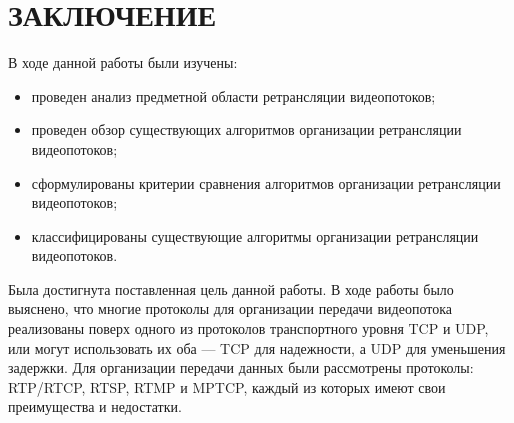 \chapter*{ЗАКЛЮЧЕНИЕ}

В ходе данной работы были изучены:
\begin{itemize}
	\item проведен анализ предметной области ретрансляции видеопотоков;
	\item проведен обзор существующих алгоритмов организации ретрансляции видеопотоков;
	\item сформулированы критерии сравнения алгоритмов организации ретрансляции видеопотоков;
	\item классифицированы существующие алгоритмы организации ретрансляции видеопотоков.  
\end{itemize}

Была достигнута поставленная цель данной работы. В ходе работы было выяснено, что многие протоколы для организации передачи видеопотока реализованы поверх одного из протоколов транспортного уровня TCP и UDP, или могут использовать их оба --- TCP для надежности, а UDP для уменьшения задержки. Для организации передачи данных были рассмотрены протоколы: RTP/RTCP, RTSP, RTMP и MPTCP, каждый из которых имеют свои преимущества и недостатки.



